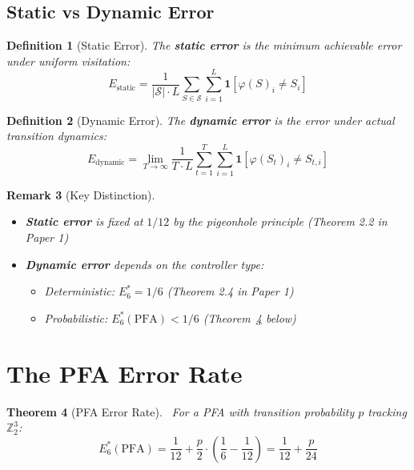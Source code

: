 \documentclass[11pt]{article}
\newtheorem{theorem}{Theorem}[section]
\newtheorem{definition}[theorem]{Definition}
\newtheorem{remark}[theorem]{Remark}
\begin{document}
\subsection{Static vs Dynamic Error}

\begin{definition}[Static Error]
The \textbf{static error} is the minimum achievable error under uniform visitation:
$$E_{\text{static}} = \frac{1}{|\mathcal{S}| \cdot L} \sum_{S \in \mathcal{S}} \sum_{i=1}^L \mathbf{1}[\varphi(S)_i \neq S_i]$$
\end{definition}

\begin{definition}[Dynamic Error]
The \textbf{dynamic error} is the error under actual transition dynamics:
$$E_{\text{dynamic}} = \lim_{T \to \infty} \frac{1}{T \cdot L} \sum_{t=1}^T \sum_{i=1}^L \mathbf{1}[\varphi(S_t)_i \neq S_{t,i}]$$
\end{definition}

\begin{remark}[Key Distinction]
\begin{itemize}
    \item \textbf{Static error} is fixed at $1/12$ by the pigeonhole principle (Theorem 2.2 in Paper 1)
    \item \textbf{Dynamic error} depends on the controller type:
    \begin{itemize}
        \item Deterministic: $E_6^* = 1/6$ (Theorem 2.4 in Paper 1)
        \item Probabilistic: $E_6^*(\text{PFA}) < 1/6$ (Theorem~\ref{thm:pfa-error} below)
    \end{itemize}
\end{itemize}
\end{remark}

\section{The PFA Error Rate}

\begin{theorem}[PFA Error Rate]~\label{thm:pfa-error}
For a PFA with transition probability $p$ tracking $\mathbb{Z}_2^3$:
$$E_6^*(\text{PFA}) = \frac{1}{12} + \frac{p}{2} \cdot \left(\frac{1}{6} - \frac{1}{12}\right) = \frac{1}{12} + \frac{p}{24}$$
\end{theorem}
\end{document}
